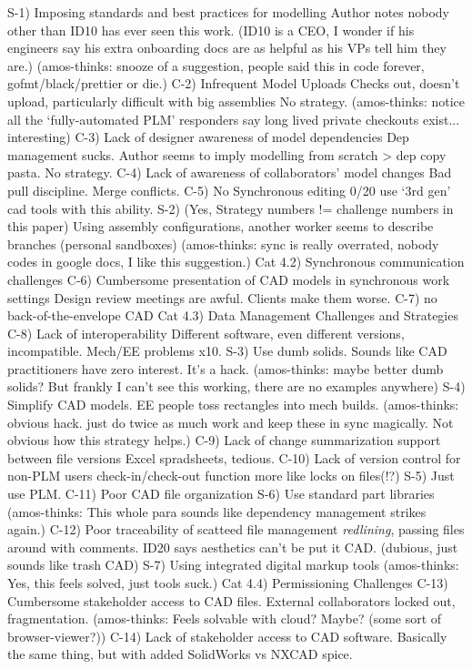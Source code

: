 \documentclass[journal,12pt,onecolumn,]{IEEEtran}
\begin{document}
S-1) Imposing standards and best practices for modelling
Author notes nobody other than ID10 has ever seen this work. 
(ID10 is a CEO, I wonder if his engineers say his extra onboarding docs are as helpful as his VPs tell him they are.)
(amos-thinks: snooze of a suggestion, people said this in code forever, gofmt/black/prettier or die.)
C-2) Infrequent Model Uploads
Checks out, doesn't upload, particularly difficult with big assemblies
No strategy.
(amos-thinks: notice all the `fully-automated PLM' responders say long lived private checkouts exist... interesting)
C-3) Lack of designer awareness of model dependencies
Dep management sucks. Author seems to imply modelling from scratch > dep copy pasta. 
No strategy.
C-4) Lack of awareness of collaborators' model changes
Bad pull discipline. Merge conflicts.
C-5) No Synchronous editing 
0/20 use `3rd gen' cad tools with this ability.
S-2) (Yes, Strategy numbers != challenge numbers in this paper) Using assembly configurations, another worker seems to describe branches (personal sandboxes)
(amos-thinks: sync is really overrated, nobody codes in google docs, I like this suggestion.)
Cat 4.2) Synchronous communication challenges
C-6) Cumbersome presentation of CAD models in synchronous work settings
Design review meetings are awful. Clients make them worse.
C-7) no back-of-the-envelope CAD
Cat 4.3) Data Management Challenges and Strategies
C-8) Lack of interoperability
Different software, even different versions, incompatible. Mech/EE problems x10.
S-3) Use dumb solids. Sounds like CAD practitioners have zero interest. It's a hack.
(amos-thinks: maybe better dumb solids? But frankly I can't see this working, there are no examples anywhere)
S-4) Simplify CAD models. EE people toss rectangles into mech builds.
(amos-thinks: obvious hack. just do twice as much work and keep these in sync magically. Not obvious how this strategy helps.)
C-9) Lack of change summarization support between file versions
Excel spradsheets, tedious. 
C-10) Lack of version control for non-PLM users
check-in/check-out function more like locks on files(!?)
S-5) Just use PLM.
C-11) Poor CAD file organization
S-6) Use standard part libraries
(amos-thinks: This whole para sounds like dependency management strikes again.)
C-12) Poor traceability of scatteed file management 
\textit{redlining}, passing files around with comments. ID20 says aesthetics can't be put it CAD. (dubious, just sounds like trash CAD)
S-7) Using integrated digital markup tools 
(amos-thinks: Yes, this feels solved, just tools suck.)
Cat 4.4) Permissioning Challenges 
C-13) Cumbersome stakeholder access to CAD files. 
External collaborators locked out, fragmentation. 
(amos-thinks: Feels solvable with cloud? Maybe? (some sort of browser-viewer?))
C-14) Lack of stakeholder access to CAD software.
Basically the same thing, but with added SolidWorks vs NXCAD spice. 











\end{document}
